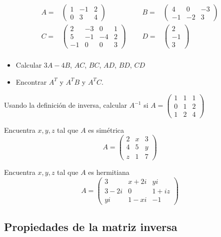 \documentclass[
]{article}
\begin{document}
\begin{equation*}
\begin{array}{ccccc}
A = & \begin{pmatrix} 1 & -1 & 2  \\ 0 & 3 & 4 \end{pmatrix} &\,\,\,\, & 
B = & \begin{pmatrix} 4 & 0 & -3  \\ -1 & -2 & 3 \end{pmatrix}  \\
C = & \begin{pmatrix} 2 & -3 & 0 & 1  \\ 5 & -1 & -4 & 2 \\ -1 & 0 & 0 & 3 \end{pmatrix} &\,\,\,\, &
D = & \begin{pmatrix}  2  \\ -1 \\ 3 \end{pmatrix}  \\
\end{array}
\end{equation*}

\begin{itemize}
\item
  Calcular \(3A - 4B\), \(AC\), \(BC\), \(AD\), \(BD\), \(CD\)
\item
  Encontrar \(A^{T}\) y \(A^{T}B\) y \(A^{T}C\).
\end{itemize}

Usando la definición de inversa, calcular \(A^{-1}\) si
\(A=\begin{pmatrix} 1 & 1 & 1 \\ 0 & 1 & 2 \\ 1 & 2 & 4 \end{pmatrix}\)

Encuentra \(x,y,z\) tal que \(A\) es simétrica \[
A = \begin{pmatrix} 2 & x & 3  \\ 4 & 5 & y\\ z & 1 & 7 \end{pmatrix}
\]

Encuentra \(x,y,z\) tal que \(A\) es hermitiana \[
A = \begin{pmatrix} 3 & x+2i & yi  \\ 3-2i & 0 & 1+iz\\ yi & 1-xi & -1 \end{pmatrix}
\]

\hypertarget{propiedades-de-la-matriz-inversa}{%
\subsection{Propiedades de la matriz
inversa}\label{propiedades-de-la-matriz-inversa}}
\end{document}
